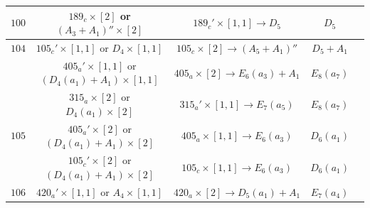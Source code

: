 \documentclass[reqno,12pt]{amsart}
\numberwithin{equation}{section}
\theoremstyle{plain}
\theoremstyle{definition}
\begin{document}
\begin{table}[htbp]
\begin{tabular}{|c|c|c|c|c|}
$ 100$    &  $ 189_c\times [2]$  or $(A_3+A_1)''\times [2]$&     $189_c'\times [1,1] \rightarrow D_5$     &   $ D_5$      \\
  \hline

$ 104$    
   &  $ 105_c'\times [1,1]$  or $D_4\times [1,1]$&    $105_c\times [2] \rightarrow (A_5+A_1)''$     &   $ D_5+A_1$      \\
   &  $ 405_a'\times [1,1]$  or $(D_4(a_1)+A_1)\times [1,1]$&    $405_a\times [2] \rightarrow E_6(a_3)+A_1$     &   $ E_8(a_7)$      \\
  &  $ 315_a\times [2]$  or $D_4(a_1)\times [2]$&    $315_a'\times [1,1] \rightarrow E_7(a_5)$ &   $ E_8(a_7)$      \\
 
  \hline

$ 105$  
&  $ 405_a'\times [2]$  or $(D_4(a_1)+A_1)\times [2]$&    $405_a\times [1,1] \rightarrow E_6(a_3)$     &   $ D_6(a_1)$      \\

     &  $ 105_c'\times [2]$  or $(D_4(a_1)+A_1)\times [2]$&    $105_c\times [1,1] \rightarrow E_6(a_3)$     &   $ D_6(a_1)$      \\
  \hline

  $ 106$   
&  $ 420_a'\times [1,1]$ or $A_4\times [1,1]$&     $420_a\times [2] \rightarrow D_5(a_1)+A_1$    &   $ E_7(a_4)$      \\


\end{tabular}
\end{table}
\end{document}
